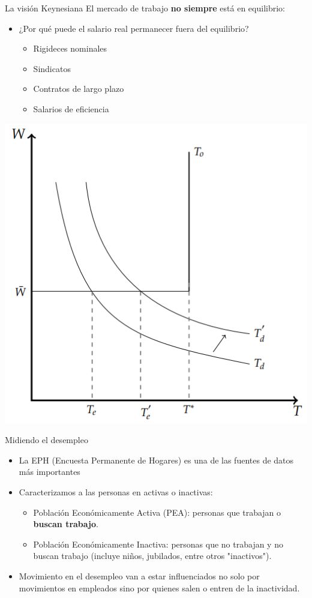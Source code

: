 \documentclass{beamer}
\begin{document}
\begin{frame}{La visión Keynesiana}
    El mercado de trabajo \textbf{no siempre} está en equilibrio:
    \begin{itemize}
        \item ¿Por qué puede el salario real permanecer fuera del equilibrio?
        \begin{itemize}
            \item Rigideces nominales
            \item Sindicatos
            \item Contratos de largo plazo
            \item Salarios de eficiencia
       \end{itemize}
    \end{itemize}
    \centering
    \includegraphics[scale=0.4]{../Figures/C34.7.png}
\end{frame}

\begin{frame}{Midiendo el desempleo}
    \begin{itemize}
        \item La EPH (Encuesta Permanente de Hogares) es una de las fuentes de datos más importantes
        \item Caracterizamos a las personas en activas o inactivas:
        \begin{itemize}
            \item Población Económicamente Activa (PEA): personas que trabajan o \textbf{buscan trabajo}.
            \item Población Económicamente Inactiva: personas que no trabajan y no buscan trabajo (incluye niños, jubilados, entre otros "inactivos").
        \end{itemize}
        \item Movimiento en el desempleo van a estar influenciados no solo por movimientos en empleados sino por quienes salen o entren de la inactividad.
    \end{itemize}
\end{frame}
\end{document}
